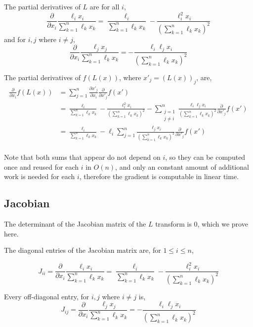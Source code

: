 \documentclass{article}
\begin{document}
The partial derivatives of $L$ are for all $i$,
$$\frac{\partial}{\partial x_i} \frac{\ell_i x_i}{\sum_{k=1}^{n} \ell_k x_k}
= \frac{\ell_i}{\sum_{k=1}^{n} \ell_k x_k}
- \frac{\ell_{i}^2 x_i}{\left( \sum_{k=1}^{n} \ell_k x_k \right)^2}$$
and for $i, j$ where $i \neq j$,
$$\frac{\partial}{\partial x_i} \frac{\ell_j x_j}{\sum_{k=1}^{n} \ell_k x_k}
= - \frac{\ell_i \ell_j x_i}{\left( \sum_{k=1}^{n} \ell_k x_k \right)^2}$$


The partial derivatives of $f(L(x))$, where $x'_j = (L(x))_j$, are,
\begin{align*}
\frac{\partial}{\partial x_i} f(L(x)) &=
    \sum_{j=1}^{n} \frac{\partial x'_j}{\partial x_i} \frac{\partial}{\partial x'_j} f(x') \\
&=
\frac{\ell_i}{\sum_{k=1}^{n} \ell_k x_k}
- \frac{\ell_{i}^2 x_i}{\left( \sum_{k=1}^{n} \ell_k x_k \right)^2} -
    \sum_{\substack{j=1 \\ j \neq i}}^{n} 
\frac{\ell_i \ell_j x_i}{\left( \sum_{k=1}^{n} \ell_k x_k \right)^2}
    \frac{\partial}{\partial x'_j} f(x') \\
    &=
\frac{\ell_i}{\sum_{k=1}^{n} \ell_k x_k}
- \ell_i \sum_{j=1}^{n}
\frac{\ell_j x_i}{\left( \sum_{k=1}^{n} \ell_k x_k \right)^2}
    \frac{\partial}{\partial x'_j} f(x') \\
\end{align*}

Note that both sums that appear do not depend on $i$, so they can be computed
once and reused for each $i$ in $O(n)$, and only an constant amount of
additional work is needed for each $i$, therefore the gradient is computable in
linear time.

\subsection{Jacobian}

The determinant of the Jacobian matrix of the $L$ transform is 0, which we prove
here.

The diagonal entries of the Jacobian matrix are, for $1 \le i \le n$,

$$J_{ii} = \frac{\partial}{\partial x_i} \frac{\ell_i x_i}{\sum_{k=1}^{n} \ell_k x_k}
= \frac{\ell_i}{\sum_{k=1}^{n} \ell_k x_k}
- \frac{\ell_{i}^2 x_i}{\left( \sum_{k=1}^{n} \ell_k x_k \right)^2}$$

Every off-diagonal entry, for $i, j$ where $i \neq j$ is,
$$J_{ij} = \frac{\partial}{\partial x_i} \frac{\ell_j x_j}{\sum_{k=1}^{n} \ell_k x_k}
= - \frac{\ell_i \ell_j x_i}{\left( \sum_{k=1}^{n} \ell_k x_k \right)^2}$$
\end{document}
